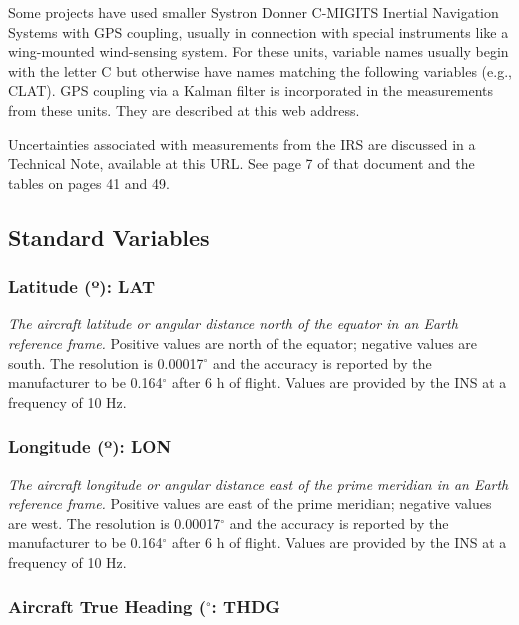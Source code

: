 \documentclass[
  english,
]{book}
\begin{document}
Some projects have used smaller Systron Donner C-MIGITS Inertial
Navigation Systems with GPS coupling, usually in connection with special
instruments like a wing-mounted wind-sensing system. For these units,
variable names usually begin with the letter C but otherwise have names
matching the following variables (e.g., CLAT). GPS coupling via a Kalman
filter is incorporated in the measurements from these units. They are
described at this web address.

Uncertainties associated with measurements from the IRS are discussed in
a Technical Note, available at this URL. See page 7 of that document and
the tables on pages 41 and 49.

\hypertarget{standard-variables}{%
\subsection{Standard Variables}\label{standard-variables}}

\hypertarget{latitude}{%
\subsubsection*{\texorpdfstring{Latitude ({º}):
LAT}{Latitude (º): LAT}}\label{latitude}}

\emph{The aircraft latitude or angular distance north of the equator in
an Earth reference frame.} Positive values are north of the equator;
negative values are south. The resolution is 0.00017\(^{\circ}\) and the
accuracy is reported by the manufacturer to be 0.164\(^{\circ}\) after 6
h of flight. Values are provided by the INS at a frequency of 10 Hz.

\hypertarget{longitude}{%
\subsubsection*{\texorpdfstring{Longitude ({º}):
LON}{Longitude (º): LON}}\label{longitude}}

\emph{The aircraft longitude or angular distance east of the prime
meridian in an Earth reference frame.} Positive values are east of the
prime meridian; negative values are west. The resolution is
0.00017\(^{\circ}\) and the accuracy is reported by the manufacturer to
be 0.164\(^{\circ}\) after 6 h of flight. Values are provided by the INS
at a frequency of 10 Hz.

\hypertarget{thdg}{%
\subsubsection*{\texorpdfstring{Aircraft True Heading (\(^{\circ}\):
THDG}{Aircraft True Heading (\^{}\{\textbackslash circ\}: THDG}}\label{thdg}}
\end{document}
